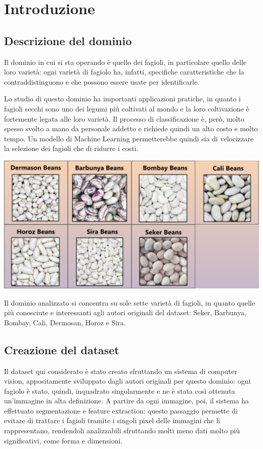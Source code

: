 \section{Introduzione}
\subsection{Descrizione del dominio}
Il dominio in cui si sta operando è quello dei fagioli, in particolare quello
delle loro varietà: ogni varietà di fagiolo ha, infatti, specifiche
caratteristiche che la contraddistinguono e che possono essere usate per
identificarle.

Lo studio di questo dominio ha importanti applicazioni pratiche, in 
quanto i fagioli secchi sono uno dei legumi più coltivati al mondo e la loro
coltivazione è fortemente legata alle loro varietà. 
Il processo di classificazione è, però, molto spesso svolto a mano 
da personale addetto e richiede quindi un alto costo e molto tempo.
Un modello di Machine Learning permetterebbe
quindi sia di velocizzare la selezione dei fagioli che di ridurre i costi.

\begin{Figure}
    \centering
    \includegraphics[width=\linewidth]{img/dry_beans.png}
\end{Figure}

Il dominio analizzato si concentra su sole sette varietà di fagioli, in quanto
quelle più conosciute e interessanti agli autori originali del dataset:
Seker, Barbunya, Bombay, Cali, Dermosan, Horoz e Sira.

\subsection{Creazione del dataset}
Il dataset \cite{dry_bean_dataset} qui considerato è stato creato sfruttando un
sistema di computer vision, appositamente sviluppato dagli autori originali
per questo dominio: ogni fagiolo è stato, quindi, inquadrato singolarmente e ne 
è stata così ottenuta un'immagine in alta definizione.
A partire da ogni immagine, poi, il sistema ha effettuato segmentazione
e feature extraction: questo passaggio permette di evitare di trattare
i fagioli tramite i singoli pixel delle immagini che li rappresentano,
rendendoli analizzabili sfruttando molti meno dati molto più significativi,
come forma e dimensioni.